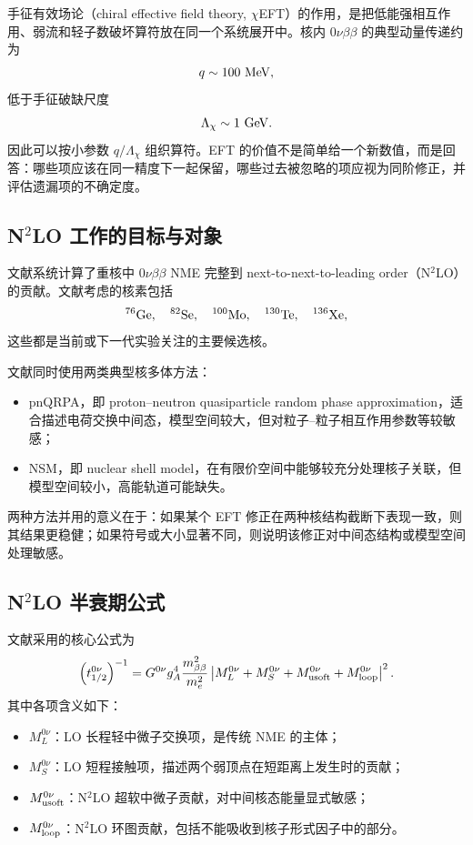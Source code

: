 \documentclass[12pt,a4paper]{ctexart}
\begin{document}
手征有效场论（chiral effective field theory, $\chi$EFT）的作用，是把低能强相互作用、弱流和轻子数破坏算符放在同一个系统展开中。核内 $0\nu\beta\beta$ 的典型动量传递约为
\begin{equation}
	q\sim100~{\rm MeV},
\end{equation}
低于手征破缺尺度
\begin{equation}
	\Lambda_\chi\sim1~{\rm GeV}.
\end{equation}
因此可以按小参数 $q/\Lambda_\chi$ 组织算符。EFT 的价值不是简单给一个新数值，而是回答：哪些项应该在同一精度下一起保留，哪些过去被忽略的项应视为同阶修正，并评估遗漏项的不确定度。

\subsection{N\texorpdfstring{$^2$}{2}LO 工作的目标与对象}

文献\cite{Castillo2025}系统计算了重核中 $0\nu\beta\beta$ NME 完整到 next-to-next-to-leading order（N$^2$LO）的贡献。文献\cite{Castillo2025}考虑的核素包括
\begin{equation}
	^{76}{\rm Ge},\quad ^{82}{\rm Se},\quad ^{100}{\rm Mo},\quad
	^{130}{\rm Te},\quad ^{136}{\rm Xe},
\end{equation}
这些都是当前或下一代实验关注的主要候选核。

文献同时使用两类典型核多体方法：
\begin{itemize}[leftmargin=2em]
	\item pnQRPA，即 proton--neutron quasiparticle random phase approximation，适合描述电荷交换中间态，模型空间较大，但对粒子--粒子相互作用参数等较敏感；
	\item NSM，即 nuclear shell model，在有限价空间中能够较充分处理核子关联，但模型空间较小，高能轨道可能缺失。
\end{itemize}
两种方法并用的意义在于：如果某个 EFT 修正在两种核结构截断下表现一致，则其结果更稳健；如果符号或大小显著不同，则说明该修正对中间态结构或模型空间处理敏感。

\subsection{N\texorpdfstring{$^2$}{2}LO 半衰期公式}

文献\cite{Castillo2025}采用的核心公式为
\begin{equation}
	\left(t_{1/2}^{0\nu}\right)^{-1}
	=
	G^{0\nu}g_A^4
	\frac{m_{\beta\beta}^2}{m_e^2}
	\left|
	M_L^{0\nu}
	+M_S^{0\nu}
	+M_{\rm usoft}^{0\nu}
	+M_{\rm loop}^{0\nu}
	\right|^2 .
	\label{eq:n2lo-half-life}
\end{equation}
其中各项含义如下：
\begin{itemize}[leftmargin=2em]
	\item $M_L^{0\nu}$：LO 长程轻中微子交换项，是传统 NME 的主体；
	\item $M_S^{0\nu}$：LO 短程接触项，描述两个弱顶点在短距离上发生时的贡献；
	\item $M_{\rm usoft}^{0\nu}$：N$^2$LO 超软中微子贡献，对中间核态能量显式敏感；
	\item $M_{\rm loop}^{0\nu}$：N$^2$LO 环图贡献，包括不能吸收到核子形式因子中的部分。
\end{itemize}
\end{document}
